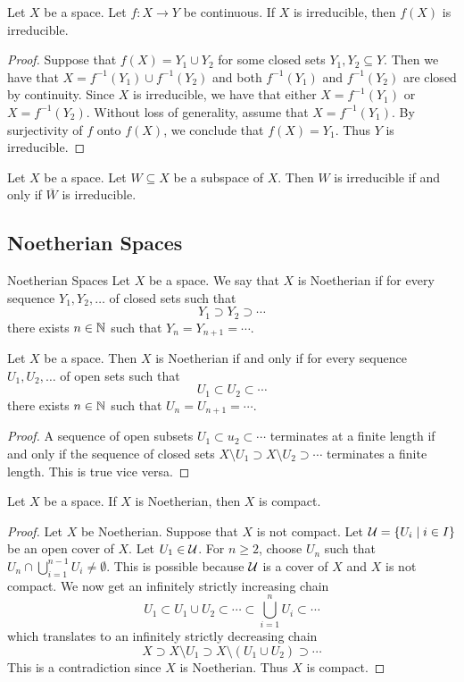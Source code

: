 \documentclass[a4paper]{article}
\begin{document}
\begin{prp}{}{} Let $X$ be a space. Let $f:X\to Y$ be continuous. If $X$ is irreducible, then $f(X)$ is irreducible. \tcbline
\begin{proof}
Suppose that $f(X)=Y_1\cup Y_2$ for some closed sets $Y_1,Y_2\subseteq Y$. Then we have that $X=f^{-1}(Y_1)\cup f^{-1}(Y_2)$ and both $f^{-1}(Y_1)$ and $f^{-1}(Y_2)$ are closed by continuity. Since $X$ is irreducible, we have that either $X=f^{-1}(Y_1)$ or $X=f^{-1}(Y_2)$. Without loss of generality, assume that $X=f^{-1}(Y_1)$. By surjectivity of $f$ onto $f(X)$, we conclude that $f(X)=Y_1$. Thus $Y$ is irreducible. 
\end{proof}
\end{prp}

\begin{lmm}{}{} Let $X$ be a space. Let $W\subseteq X$ be a subspace of $X$. Then $W$ is irreducible if and only if $\overline{W}$ is irreducible. 
\end{lmm}

\subsection{Noetherian Spaces}
\begin{defn}{Noetherian Spaces}{} Let $X$ be a space. We say that $X$ is Noetherian if for every sequence $Y_1,Y_2,\dots$ of closed sets such that $$Y_1\supset Y_2\supset\cdots$$ there exists $n\in\mathbb{N}$ such that $Y_n=Y_{n+1}=\cdots$. 
\end{defn}

\begin{prp}{}{} Let $X$ be a space. Then $X$ is Noetherian if and only if for every sequence $U_1,U_2,\dots$ of open sets such that $$U_1\subset U_2\subset\cdots$$ there exists $n\in\mathbb{N}$ such that $U_n=U_{n+1}=\cdots$. \tcbline
\begin{proof}
A sequence of open subsets $U_1\subset u_2\subset\cdots$ terminates at a finite length if and only if the sequence of closed sets $X\setminus U_1\supset X\setminus U_2\supset\cdots$ terminates a finite length. This is true vice versa. 
\end{proof}
\end{prp}

\begin{prp}{}{} Let $X$ be a space. If $X$ is Noetherian, then $X$ is compact. \tcbline
\begin{proof}
Let $X$ be Noetherian. Suppose that $X$ is not compact. Let $\mathcal{U}=\{U_i\;|\;i\in I\}$ be an open cover of $X$. Let $U_1\in\mathcal{U}$. For $n\geq 2$, choose $U_n$ such that $U_n\cap\bigcup_{i=1}^{n-1}U_i\neq\emptyset$. This is possible because $\mathcal{U}$ is a cover of $X$ and $X$ is not compact. We now get an infinitely strictly increasing chain $$U_1\subset U_1\cup U_2\subset\cdots\subset\bigcup_{i=1}^nU_i\subset\cdots$$ which translates to an infinitely strictly decreasing chain $$X\supset X\setminus U_1\supset X\setminus(U_1\cup U_2)\supset\cdots$$ This is a contradiction since $X$ is Noetherian. Thus $X$ is compact. 
\end{proof}
\end{prp}
\end{document}

